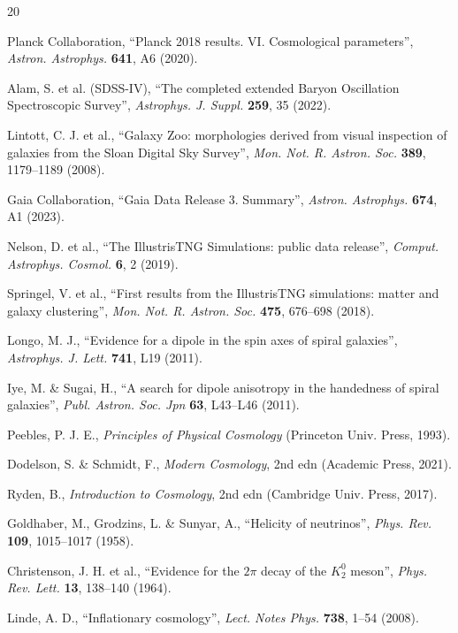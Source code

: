 \documentclass[a4paper,10pt]{article}
\begin{document}
\begin{thebibliography}{20}

Planck Collaboration,
``Planck 2018 results. VI. Cosmological parameters'',
\textit{Astron. Astrophys.} \textbf{641}, A6 (2020).

Alam, S. et al. (SDSS-IV),
``The completed extended Baryon Oscillation Spectroscopic Survey'',
\textit{Astrophys. J. Suppl.} \textbf{259}, 35 (2022).

Lintott, C. J. et al.,
``Galaxy Zoo: morphologies derived from visual inspection of galaxies from the
Sloan Digital Sky Survey'',
\textit{Mon. Not. R. Astron. Soc.} \textbf{389}, 1179--1189 (2008).

Gaia Collaboration,
``Gaia Data Release 3. Summary'',
\textit{Astron. Astrophys.} \textbf{674}, A1 (2023).

Nelson, D. et al.,
``The IllustrisTNG Simulations: public data release'',
\textit{Comput. Astrophys. Cosmol.} \textbf{6}, 2 (2019).

Springel, V. et al.,
``First results from the IllustrisTNG simulations: matter and galaxy
clustering'',
\textit{Mon. Not. R. Astron. Soc.} \textbf{475}, 676--698 (2018).

Longo, M. J.,
``Evidence for a dipole in the spin axes of spiral galaxies'',
\textit{Astrophys. J. Lett.} \textbf{741}, L19 (2011).

Iye, M. \& Sugai, H.,
``A search for dipole anisotropy in the handedness of spiral galaxies'',
\textit{Publ. Astron. Soc. Jpn} \textbf{63}, L43--L46 (2011).

Peebles, P. J. E.,
\textit{Principles of Physical Cosmology}
(Princeton Univ. Press, 1993).

Dodelson, S. \& Schmidt, F.,
\textit{Modern Cosmology}, 2nd edn
(Academic Press, 2021).

Ryden, B.,
\textit{Introduction to Cosmology}, 2nd edn
(Cambridge Univ. Press, 2017).

Goldhaber, M., Grodzins, L. \& Sunyar, A.,
``Helicity of neutrinos'',
\textit{Phys. Rev.} \textbf{109}, 1015--1017 (1958).

Christenson, J. H. et al.,
``Evidence for the $2\pi$ decay of the $K_2^0$ meson'',
\textit{Phys. Rev. Lett.} \textbf{13}, 138--140 (1964).

Linde, A. D.,
``Inflationary cosmology'',
\textit{Lect. Notes Phys.} \textbf{738}, 1--54 (2008).


\end{thebibliography}
\end{document}
